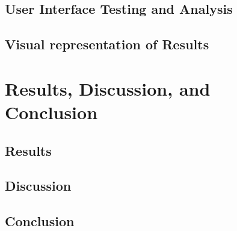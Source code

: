 \documentclass[doc,apacite,12pt]{apa6}
\begin{document}
\clearpage

\subsection{User Interface Testing and Analysis}


\subsection{Visual representation of Results}


\clearpage

\section{Results, Discussion, and Conclusion}

\subsection{Results}


\subsection{Discussion}


\subsection{Conclusion}


% 


\end{document}
